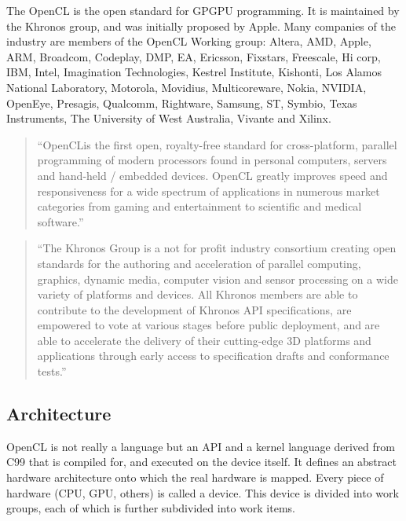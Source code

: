 The \gls{OpenCL} is the open standard for \gls{GPGPU} programming. It is maintained by the Khronos group, and was initially proposed by Apple. Many companies of the industry are members of the \gls{OpenCL} Working group: Altera, AMD, Apple, ARM, Broadcom, Codeplay, DMP, EA, Ericsson, Fixstars, Freescale, Hi corp, IBM, Intel, Imagination Technologies, Kestrel Institute, Kishonti, Los Alamos National Laboratory, Motorola, Movidius, Multicoreware, Nokia, NVIDIA, OpenEye, Presagis, Qualcomm, Rightware, Samsung, ST, Symbio, Texas Instruments, The University of West Australia, Vivante and Xilinx.\cite{opencl}
\begin{quotation}
``OpenCL\texttrademark is the first open, royalty-free standard for cross-platform, parallel programming of modern processors found in personal computers, servers and hand-held / embedded devices. \gls{OpenCL} greatly improves speed and responsiveness for a wide spectrum of applications in numerous market categories from gaming and entertainment to scientific and medical software.''\cite{opencl}
\end{quotation}
\begin{quotation}
``The Khronos Group is a not for profit industry consortium creating open standards for the authoring and acceleration of parallel computing, graphics, dynamic media, computer vision and sensor processing on a wide variety of platforms and devices. All Khronos members are able to contribute to the development of Khronos \gls{API} specifications, are empowered to vote at various stages before public deployment, and are able to accelerate the delivery of their cutting-edge 3D platforms and applications through early access to specification drafts and conformance tests.''\cite{khronos}
\end{quotation}

\subsection{Architecture}

\gls{OpenCL} is not really a language but an \gls{API} and a kernel language derived from C99 that is compiled for, and executed on the device itself. It defines an abstract hardware architecture onto which the real hardware is mapped. Every piece of hardware (\gls{CPU}, \gls{GPU}, others) is called a device. This device is divided into work groups, each of which is further subdivided into work items.

